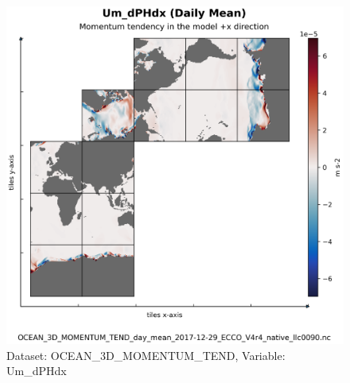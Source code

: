 \begin{figure}[H]
\centering
\includegraphics[scale=0.55]{../images/plots/native_plots/Ocean_Three-Dimensional_Momentum_Tendency/Um_dPHdx.png}
\caption{Dataset: OCEAN\_3D\_MOMENTUM\_TEND, Variable: Um\_dPHdx}
\label{tab:table-OCEAN_3D_MOMENTUM_TEND_Um_dPHdx-Plot}
\end{figure}
\pagebreak
